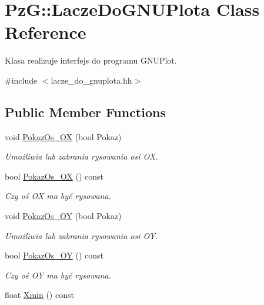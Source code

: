 \hypertarget{class_pz_g_1_1_lacze_do_g_n_u_plota}{}\section{PzG\+::Lacze\+Do\+G\+N\+U\+Plota Class Reference}
\label{class_pz_g_1_1_lacze_do_g_n_u_plota}


Klasa realizuje interfejs do programu G\+N\+U\+Plot.  




{\ttfamily \#include $<$lacze\+\_\+do\+\_\+gnuplota.\+hh$>$}

\subsection*{Public Member Functions}
\begin{DoxyCompactItemize}
\item 
void \mbox{\hyperlink{class_pz_g_1_1_lacze_do_g_n_u_plota_a11421d7c67deab6b7524cc492407e897}{Pokaz\+Os\+\_\+\+OX}} (bool Pokaz)
\begin{DoxyCompactList}\small\item\em Umożliwia lub zabrania rysowania osi OX. \end{DoxyCompactList}\item 
bool \mbox{\hyperlink{class_pz_g_1_1_lacze_do_g_n_u_plota_ae112972af57167c3b053bf922bce6bbf}{Pokaz\+Os\+\_\+\+OX}} () const
\begin{DoxyCompactList}\small\item\em Czy oś OX ma być rysowana. \end{DoxyCompactList}\item 
void \mbox{\hyperlink{class_pz_g_1_1_lacze_do_g_n_u_plota_a7c3db909b266fc30808e86406c04b516}{Pokaz\+Os\+\_\+\+OY}} (bool Pokaz)
\begin{DoxyCompactList}\small\item\em Umożliwia lub zabrania rysowania osi OY. \end{DoxyCompactList}\item 
bool \mbox{\hyperlink{class_pz_g_1_1_lacze_do_g_n_u_plota_a7298f469f6932f5c808dcf620650b4b8}{Pokaz\+Os\+\_\+\+OY}} () const
\begin{DoxyCompactList}\small\item\em Czy oś OY ma być rysowana. \end{DoxyCompactList}\item 
float \mbox{\hyperlink{class_pz_g_1_1_lacze_do_g_n_u_plota_a66836c9749bf179420e4ca3e9447efd7}{Xmin}} () const

\end{DoxyCompactItemize}
